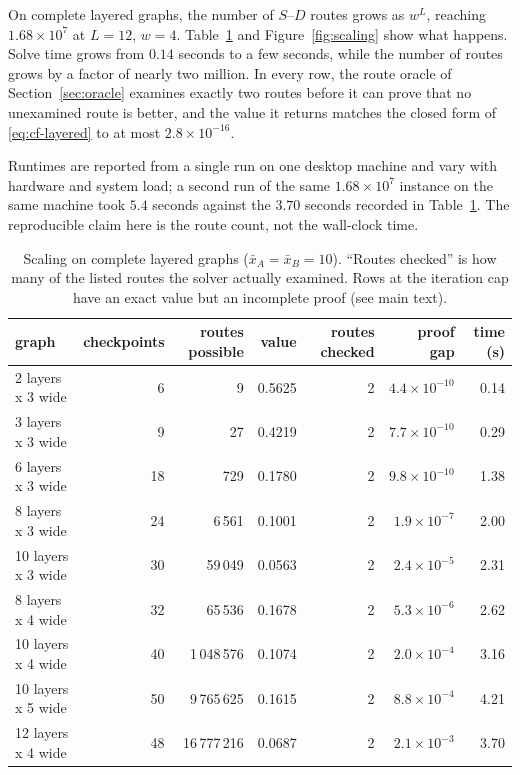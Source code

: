 \documentclass[11pt,a4paper]{article}
\theoremstyle{plain}
\theoremstyle{definition}
\newcommand{\XA}{\bar{x}_A}
\newcommand{\XB}{\bar{x}_B}
\begin{document}
On complete layered graphs, the number of $S$--$D$ routes grows as $w^L$,
reaching $1.68\times10^7$ at $L=12$, $w=4$. Table~\ref{tab:e7} and
Figure~\ref{fig:scaling} show what happens. Solve time grows from
$0.14$ seconds to a few seconds, while the number of routes grows by a
factor of nearly two million. In every row, the route oracle of
Section~\ref{sec:oracle} examines exactly two routes before it can prove
that no unexamined route is better, and the value it returns matches the
closed form of \eqref{eq:cf-layered} to at most $2.8\times10^{-16}$.

Runtimes are reported from a single run on one desktop machine and vary
with hardware and system load; a second run of the same $1.68\times10^7$
instance on the same machine took $5.4$ seconds against the $3.70$
seconds recorded in Table~\ref{tab:e7}. The reproducible claim here is
the route count, not the wall-clock time.

\begin{table}[htbp]
\centering
\caption{Scaling on complete layered graphs ($\XA=\XB=10$). ``Routes
checked'' is how many of the listed routes the solver actually examined.
Rows at the iteration cap have an exact value but an incomplete proof
(see main text).}
\label{tab:e7}
\small
\setlength{\tabcolsep}{4pt}
\begin{tabular}{lrrrrrr}
\toprule
graph & checkpoints & routes possible & value & routes checked & proof gap & time (s)\\
\midrule
2 layers x 3 wide  &  6 & 9          & 0.5625 & 2 & $4.4\times10^{-10}$ & 0.14\\
3 layers x 3 wide  &  9 & 27         & 0.4219 & 2 & $7.7\times10^{-10}$ & 0.29\\
6 layers x 3 wide  & 18 & 729        & 0.1780 & 2 & $9.8\times10^{-10}$ & 1.38\\
8 layers x 3 wide  & 24 & 6\,561     & 0.1001 & 2 & $1.9\times10^{-7}$  & 2.00\\
10 layers x 3 wide & 30 & 59\,049    & 0.0563 & 2 & $2.4\times10^{-5}$  & 2.31\\
8 layers x 4 wide  & 32 & 65\,536    & 0.1678 & 2 & $5.3\times10^{-6}$  & 2.62\\
10 layers x 4 wide & 40 & 1\,048\,576& 0.1074 & 2 & $2.0\times10^{-4}$  & 3.16\\
10 layers x 5 wide & 50 & 9\,765\,625& 0.1615 & 2 & $8.8\times10^{-4}$  & 4.21\\
12 layers x 4 wide & 48 & 16\,777\,216& 0.0687 & 2 & $2.1\times10^{-3}$ & 3.70\\
\bottomrule
\end{tabular}
\end{table}
\end{document}
